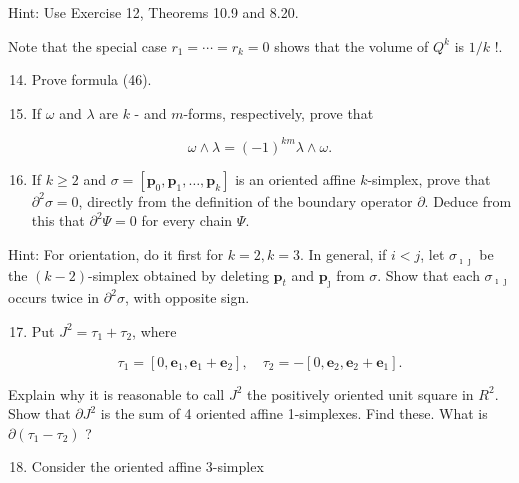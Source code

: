 \documentclass[10pt]{article}
\begin{document}
Hint: Use Exercise 12, Theorems 10.9 and 8.20.

Note that the special case $r_{1}=\cdots=r_{k}=0$ shows that the volume of $Q^{k}$ is $1 / k$ !.

\begin{enumerate}
  \setcounter{enumi}{13}
  \item Prove formula (46).

  \item If $\omega$ and $\lambda$ are $k$ - and $m$-forms, respectively, prove that

\end{enumerate}

$$
\omega \wedge \lambda=(-1)^{k m} \lambda \wedge \omega .
$$

\begin{enumerate}
  \setcounter{enumi}{15}
  \item If $k \geq 2$ and $\sigma=\left[\mathbf{p}_{0}, \mathbf{p}_{1}, \ldots, \mathbf{p}_{k}\right]$ is an oriented affine $k$-simplex, prove that $\partial^{2} \sigma=0$, directly from the definition of the boundary operator $\partial$. Deduce from this that $\partial^{2} \Psi=0$ for every chain $\Psi$.
\end{enumerate}

Hint: For orientation, do it first for $k=2, k=3$. In general, if $i<j$, let $\sigma_{\imath \jmath}$ be the $(k-2)$-simplex obtained by deleting $\mathbf{p}_{t}$ and $\mathbf{p}_{\jmath}$ from $\sigma$. Show that each $\sigma_{\imath \jmath}$ occurs twice in $\partial^{2} \sigma$, with opposite sign.

\begin{enumerate}
  \setcounter{enumi}{16}
  \item Put $J^{2}=\tau_{1}+\tau_{2}$, where
\end{enumerate}

$$
\tau_{1}=\left[0, \mathbf{e}_{1}, \mathbf{e}_{1}+\mathbf{e}_{2}\right], \quad \tau_{2}=-\left[0, \mathbf{e}_{2}, \mathbf{e}_{2}+\mathbf{e}_{1}\right] .
$$

Explain why it is reasonable to call $J^{2}$ the positively oriented unit square in $R^{2}$. Show that $\partial J^{2}$ is the sum of 4 oriented affine 1-simplexes. Find these. What is $\partial\left(\tau_{1}-\tau_{2}\right)$ ?

\begin{enumerate}
  \setcounter{enumi}{17}
  \item Consider the oriented affine 3-simplex
\end{enumerate}
\end{document}
